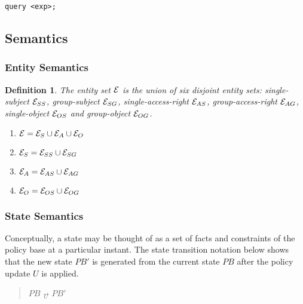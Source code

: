\documentclass[10pt, twocolumn]{article}
\newtheorem{definition}{Definition}
\begin{document}
        \begin{verbatim}query <exp>;\end{verbatim} 

    \subsection{Semantics}

      \subsubsection{Entity Semantics}

        \begin{definition}

          The entity set ${\cal E}$ is the union of six disjoint entity sets:
          single-subject ${\cal E}_{SS}$, group-subject ${\cal E}_{SG}$,
          single-access-right ${\cal E}_{AS}$, group-access-right
          ${\cal E}_{AG}$, single-object ${\cal E}_{OS}$ and group-object
          ${\cal E}_{OG}$.

          \begin{enumerate}
            \item
              ${\cal E} = {\cal E}_{S} \cup {\cal E}_{A} \cup {\cal E}_{O}$
            \item
              ${\cal E}_{S} = {\cal E}_{SS} \cup {\cal E}_{SG}$
            \item
              ${\cal E}_{A} = {\cal E}_{AS} \cup {\cal E}_{AG}$
            \item
              ${\cal E}_{O} = {\cal E}_{OS} \cup {\cal E}_{OG}$
          \end{enumerate}

        \end{definition}

      \subsubsection{State Semantics}

        Conceptually, a state may be thought of as a set of facts and
        constraints of the policy base at a particular instant. The state
        transition notation below shows that the new state $PB'$ is generated
        from the current state $PB$ after the policy update $U$ is applied.

        \begin{quote}
          $PB$ $\overrightarrow{_{U}}$ $PB'$
        \end{quote}
\end{document}
